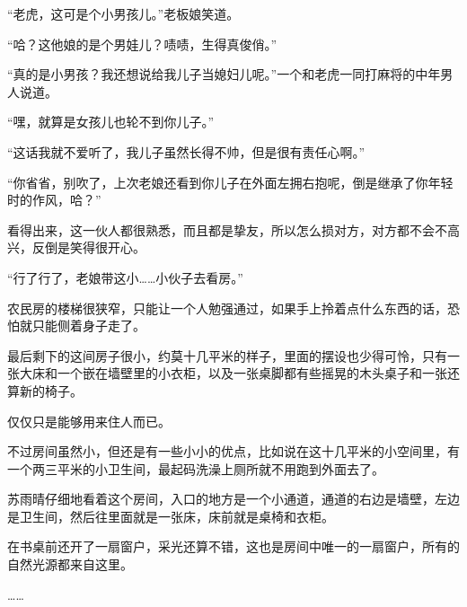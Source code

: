 “老虎，这可是个小男孩儿。”老板娘笑道。

“哈？这他娘的是个男娃儿？啧啧，生得真俊俏。”

“真的是小男孩？我还想说给我儿子当媳妇儿呢。”一个和老虎一同打麻将的中年男人说道。

“嘿，就算是女孩儿也轮不到你儿子。”

“这话我就不爱听了，我儿子虽然长得不帅，但是很有责任心啊。”

“你省省，别吹了，上次老娘还看到你儿子在外面左拥右抱呢，倒是继承了你年轻时的作风，哈？”

看得出来，这一伙人都很熟悉，而且都是挚友，所以怎么损对方，对方都不会不高兴，反倒是笑得很开心。

“行了行了，老娘带这小……小伙子去看房。”

农民房的楼梯很狭窄，只能让一个人勉强通过，如果手上拎着点什么东西的话，恐怕就只能侧着身子走了。

最后剩下的这间房子很小，约莫十几平米的样子，里面的摆设也少得可怜，只有一张大床和一个嵌在墙壁里的小衣柜，以及一张桌脚都有些摇晃的木头桌子和一张还算新的椅子。

仅仅只是能够用来住人而已。

不过房间虽然小，但还是有一些小小的优点，比如说在这十几平米的小空间里，有一个两三平米的小卫生间，最起码洗澡上厕所就不用跑到外面去了。

苏雨晴仔细地看着这个房间，入口的地方是一个小通道，通道的右边是墙壁，左边是卫生间，然后往里面就是一张床，床前就是桌椅和衣柜。

在书桌前还开了一扇窗户，采光还算不错，这也是房间中唯一的一扇窗户，所有的自然光源都来自这里。

……
